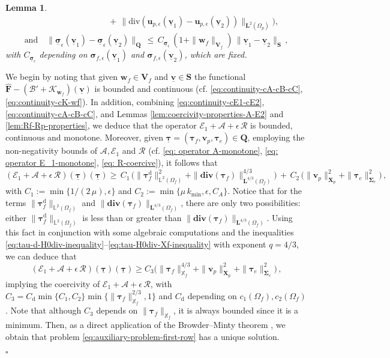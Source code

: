 \documentclass[11pt]{article}
\numberwithin{equation}{section}
\newcommand{\bsi}{{\boldsymbol\sigma}}
\newcommand{\bSigma}{{\boldsymbol\Sigma}}
\newcommand{\btau}{{\boldsymbol\tau}}
\newcommand{\ubsi}{\underline{\bsi}}
\newcommand{\ubtau}{\underline{\btau}}
\newcommand{\ubv}{\underline{\bv}}
\newcommand{\bv}{{\mathbf{v}}}
\newcommand{\bw}{{\mathbf{w}}}
\newcommand{\bu}{\mathbf{u}}
\newcommand{\0}{{\mathbf{0}}}
\def\bF{\mathbf{F}}
\def\bX{\mathbf{X}}
\def\bV{\mathbf{V}}
\def\bQ{\mathbf{Q}}
\def\bS{\mathbf{S}}
\newcommand{\bL}{\mathbf{L}}
\newcommand\bbX{\mathbb{X}}
\newcommand\bbL{\mathbb{L}}
\newcommand{\cA}{\mathcal{A}}
\newcommand{\cB}{\mathcal{B}}
\newcommand{\cE}{\mathcal{E}}
\newcommand{\cK}{\mathcal{K}}
\newcommand{\cR}{\mathcal{R}}
\def\rd{\mathrm{d}}
\def\bdiv{\mathbf{div}}
\def\div{\mathrm{div}}
\def\wh{\widehat}
\newtheorem{lem}[thm]{Lemma}
\newenvironment{proof}{\noindent{\it Proof.}}{\hfill$\square$}
\numberwithin{equation}{section}
\begin{document}
\begin{lem}
\begin{align}
& \qquad \qquad \qquad\qquad+\, \|\div(\bu_{p,\epsilon}(\ubv_1)-\bu_{p,\epsilon}(\ubv_2))\|_{\bL^2(\Omega_p)}\Big),\label{eq:auxiliary-bound-3}
\end{align}
\begin{equation}\label{eq:auxiliary-bound-4}
\mbox{and}\quad \|\ubsi_\epsilon(\ubv_1) - \ubsi_\epsilon(\ubv_2)\|_\bQ 
\,\leq\, C_{\ubsi_{\epsilon}}\,(1 + \|\bw_f\|_{\bV_f})\,\|\ubv_1 - \ubv_2\|_\bS\,,
\end{equation}
with $C_{\ubsi_{\epsilon}}$ depending on $\bsi_{f,\epsilon}(\ubv_1)$ and $\bsi_{f,\epsilon}(\ubv_2)$, which are fixed.
\end{lem}
%
\begin{proof}
We begin by noting that given $\bw_f\in \bV_f$ and $\ubv\in \bS$ the functional $\wh{\bF} - (\cB' + \cK_{\bw_f})(\ubv)$ is bounded and continuous (cf. \eqref{eq:continuity-cA-cB-cC}, \eqref{eq:continuity-cK-wf}). In addition, combining \eqref{eq:continuity-cE1-cE2}, \eqref{eq:continuity-cA-cB-cC}, and Lemmas \ref{lem:coercivity-properties-A-E2} and \ref{lem:Rf-Rp-properties}, we deduce that the operator $\cE_1 + \cA + \epsilon\,\cR$ is bounded, continuous and monotone. 
Moreover, given $\ubtau = (\btau_f, \bv_p, \btau_e)\in \bQ$, employing the non-negativity bounds of $\cA, \cE_1$ and $ \cR$ (cf. \eqref{eq: operator A-monotone}, \eqref{eq: operator E_1-monotone}, \eqref{eq: R-coercive}), it follows that
\begin{equation}\label{eq:E1-A-epsR coercive}
(\cE_1 + \cA + \epsilon\,\cR)(\ubtau)(\ubtau) \geq \, C_1\,\Big( \|\btau^\rd_f\|^2_{\bbL^2(\Omega_f)} + \|\bdiv(\btau_f)\|^{4/3}_{\bL^{4/3}(\Omega_f)} \Big)
\,+\, C_2\,\Big(\|\bv_p\|^2_{\bX_p} + \|\btau_e\|^2_{\bSigma_e}\Big) \,,
\end{equation}
with $C_1:= \min\big\{ 1/(2\,\mu), \epsilon \big\}$ and $C_2:=\min\big\{\mu\,k_{\min},\epsilon, C_A \big\}$.
Notice that for the terms $\|\btau^\rd_f\|_{\bbL^2(\Omega_f)}$ and $\|\bdiv(\btau_f)\|_{\bL^{4/3}(\Omega_f)}$, there are only two possibilities: either $\|\btau^\rd_f\|_{\bbL^2(\Omega_f)}$ is less than or greater than $\|\bdiv(\btau_f)\|_{\bL^{4/3}(\Omega_f)}$. Using this fact in conjunction with some algebraic computations and the inequalities \eqref{eq:tau-d-H0div-inequality}--\eqref{eq:tau-H0div-Xf-inequality} with exponent $q=4/3$, we can deduce that
\begin{equation}\label{eq:coercivity-E1-A-R}
(\cE_1 + \cA + \epsilon\,\cR)(\ubtau)(\ubtau)
\geq C_3\big( \|\btau_{f}\|^{4/3}_{\bbX_f} 
+ \|\bv_p\|^2_{\bX_p} 
+ \|\btau_e\|^2_{\bSigma_e} \big)\,,
\end{equation}
implying the coercivity of $\cE_1 + \cA + \epsilon\,\cR$, with $C_3=C_\rd\min\{C_1,C_2\}\min\big\{ \|\btau_{f}\|^{2/3}_{\bbX_f},1 \big\}$ and $C_\rd$ depending on $c_1(\Omega_f), c_2(\Omega_f)$. 
Note that although $C_3$ depends on $\|\btau_{f}\|_{\bbX_f}$, it is always bounded since it is a minimum.
Then, as a direct application of the Browder--Minty theorem \cite[Theorem 10.49]{Renardy-Rogers}, we obtain that problem \eqref{eq:auxiliary-problem-first-row} has a unique solution.


\end{proof}
\end{document}
